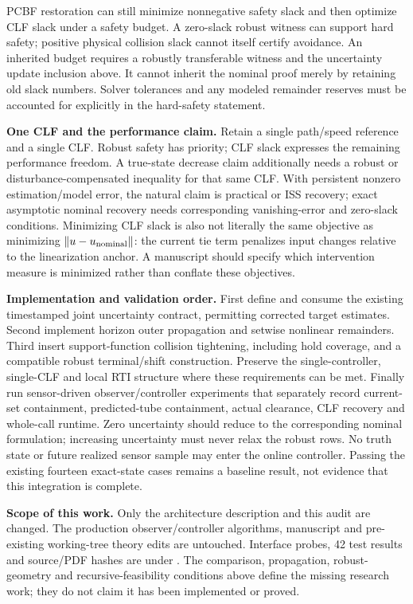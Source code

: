 \documentclass[10pt]{article}
\begin{document}
PCBF restoration can still minimize nonnegative safety slack and then optimize
CLF slack under a safety budget. A zero-slack robust witness can support hard
safety; positive physical collision slack cannot itself certify avoidance.
An inherited budget requires a robustly transferable witness and the uncertainty
update inclusion above. It cannot inherit the nominal proof merely by retaining
old slack numbers. Solver tolerances and any modeled remainder reserves must be
accounted for explicitly in the hard-safety statement.

\textbf{One CLF and the performance claim.} Retain a single path/speed reference
and a single CLF. Robust safety has priority; CLF slack expresses the remaining
performance freedom. A true-state decrease claim additionally needs a robust
or disturbance-compensated inequality for that same CLF. With persistent
nonzero estimation/model error, the natural claim is practical or ISS recovery;
exact asymptotic nominal recovery needs corresponding vanishing-error and
zero-slack conditions. Minimizing CLF slack is also not literally the same
objective as minimizing $\|u-u_{\rm nominal}\|$: the current tie term penalizes
input changes relative to the linearization anchor. A manuscript should specify
which intervention measure is minimized rather than conflate these objectives.

\textbf{Implementation and validation order.} First define and consume the
existing timestamped joint uncertainty contract, permitting corrected target
estimates. Second implement horizon outer propagation and setwise nonlinear
remainders. Third insert support-function collision tightening, including hold
coverage, and a compatible robust terminal/shift construction. Preserve the
single-controller, single-CLF and local RTI structure where these requirements
can be met. Finally run sensor-driven observer/controller experiments that
separately record current-set containment, predicted-tube containment, actual
clearance, CLF recovery and whole-call runtime. Zero uncertainty should reduce
to the corresponding nominal formulation; increasing uncertainty must never
relax the robust rows. No truth state or future realized sensor sample may enter
the online controller. Passing the existing fourteen exact-state cases remains
a baseline result, not evidence that this integration is complete.

\textbf{Scope of this work.} Only the architecture description and this audit
are changed. The production observer/controller algorithms, manuscript and
pre-existing working-tree theory edits are untouched. Interface probes, 42 test
results and source/PDF hashes are under
. The comparison, propagation,
robust-geometry and recursive-feasibility conditions above define the missing
research work; they do not claim it has been implemented or proved.
\end{document}
